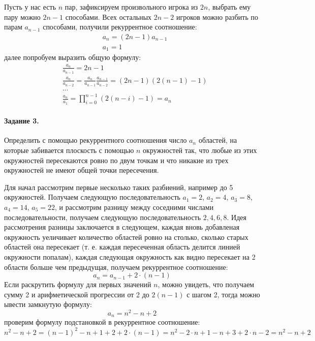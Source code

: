 \documentclass[a4paper,12pt]{article}
\begin{document}
\begin{Solution}
Пусть у нас есть $n$ пар, зафиксируем произвольного игрока из $2n$, выбрать ему пару можно $2n-1$ способами. Всех остальных $2n-2$ игроков можно разбить по парам $a_{n-1}$ способами, получили рекуррентное соотношение:
\[
	\begin{split}
		& a_n = \left(2n - 1\right) a_{n-1} \\
		& a_1 = 1
	\end{split}
\]
далее попробуем выразить общую формулу:
\[
	\begin{split}
		& \frac{a_n}{a_{n-1}} = 2n-1 \\
		& \frac{a_n}{a_{n-2}} = \frac{a_n}{a_{n-1}} \frac{a_{n-1}}{a_{n-2}} = \left(2n-1\right) \left(2 \left(n-1\right) - 1\right) \\
		& ... \\
		& \frac{a_n}{a_1} = \prod_{i=0}^{n-1} \left(2\left(n-i\right)-1\right) = a_n
	\end{split}
\]
\end{Solution}

\paragraph{Задание 3.} Определить с помощью рекуррентного соотношения число $a_n$ областей, на которые забивается плоскость с помощью $n$ окружностей так, что любые из этих окружностей пересекаются ровно по двум точкам и что никакие из трех окружностей не имеют общей точки пересечения.

\begin{Solution}
Для начал рассмотрим первые несколько таких разбиений, например до 5 окружностей. Получаем следующую последовательность $a_1 = 2$, $a_2 = 4$, $a_3 = 8$, $a_4 = 14$, $a_5 = 22$, и рассмотрим разницу между соседними числами последовательности, получаем следующую последовательность $2, 4, 6, 8$. Идея рассмотрения разницы заключается в следующем, каждая вновь добавленая окружность уеличивает количество областей ровно на столько, сколько старых областей она пересекает (т. е. каждая пересеченная область делится линией окружности попалам), каждая следующая окружность как видно пересекает на 2 области больше чем предыдущая, получаем рекуррентное соотношение:
\[
	a_n = a_{n-1} + 2 \cdot (n-1)
\]
Если раскрутить формулу для первых значений $n$, можно увидеть, что получаем сумму 2 и арифметической прогрессии от 2 до $2\left(n-1\right)$ с шагом 2, тогда можно ывести замкнутую формулу:
\[
	a_n = n^2 - n + 2
\]
проверим формулу подстановкой в рекуррентное соотношение:
\[
	n^2 - n + 2 = {\left(n-1\right)}^2 - n + 1 + 2 + 2 \cdot \left(n - 1\right) = n^2 - 2\cdot n + 1 - n + 3 + 2\cdot n - 2 = n^2 - n + 2
\]
\end{Solution}
\end{document}
